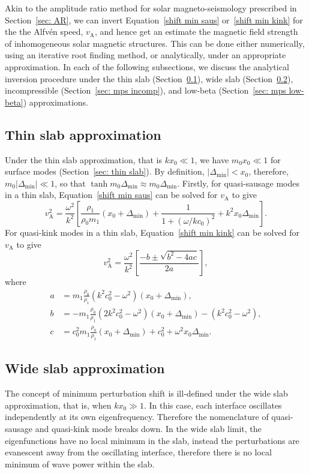 \documentclass[12pt]{../style-files/ociamthesis}
\begin{document}
Akin to the amplitude ratio method for solar magneto-seismology prescribed in Section~\ref{sec: AR}, we can invert Equation~\eqref{shift min saus} or~\eqref{shift min kink} for the the Alfv\'{e}n speed, $v_\textrm{A}$, and hence get an estimate the magnetic field strength of inhomogeneous solar magnetic structures. This can be done either numerically, using an iterative root finding method, or analytically, under an appropriate approximation. In each of the following subsections, we discuss the analytical inversion procedure under the thin slab (Section~\ref{sec: mps thin}), wide slab (Section~\ref{sec: mps wide}), incompressible (Section~\ref{sec: mps incomp}), and low-beta (Section~\ref{sec: mps low-beta}) approximations.


\subsection{Thin slab approximation} \label{sec: mps thin}
Under the thin slab approximation, that is $kx_0 \ll 1$, we have $m_0x_0 \ll 1$ for surface modes (Section~\ref{sec: thin slab}). By definition, $|\Delta_\textrm{min}| < x_0$, therefore, $m_0|\Delta_\textrm{min}| \ll 1$, so that $\tanh{m_0\Delta_\textrm{min}} \approx m_0\Delta_\textrm{min}$. Firstly, for quasi-sausage modes in a thin slab, Equation~\eqref{shift min saus} can be solved for $v_\textrm{A}$ to give
\begin{equation}
v_\textrm{A}^2 = \frac{\omega^2}{k^2} \left[\frac{\rho_1}{\rho_0m_1}(x_0 + \Delta_\textrm{min}) + \frac{1}{1 + (\omega / kc_0)^2} + k^2x_0\Delta_\textrm{min}\right].
\end{equation}
For quasi-kink modes in a thin slab, Equation~\eqref{shift min kink} can be solved for $v_\textrm{A}$ to give
\begin{equation}
v_\textrm{A}^2 = \frac{\omega^2}{k^2}\left[\frac{-b \pm \sqrt{b^2 - 4ac}}{2a}\right],
\end{equation}
where
\begin{align}
a &= m_1\frac{\rho_0}{\rho_1}(k^2c_0^2 - \omega^2)(x_0 + \Delta_\textrm{min}), \\
b &= -m_1\frac{\rho_0}{\rho_1}(2k^2c_0^2 - \omega^2)(x_0 + \Delta_\textrm{min}) - (k^2c_0^2 - \omega^2), \\
c &= c_0^2m_1\frac{\rho_0}{\rho_1}(x_0 + \Delta_\textrm{min}) + c_0^2 + \omega^2x_0\Delta_\textrm{min}.
\end{align}


\subsection{Wide slab approximation} \label{sec: mps wide}
The concept of minimum perturbation shift is ill-defined under the wide slab approximation, that is, when $kx_0 \gg 1$. In this case, each interface oscillates independently at its own eigenfrequency. Therefore the nomenclature of quasi-sausage and quasi-kink mode breaks down. In the wide slab limit, the eigenfunctions have no local minimum in the slab, instead the perturbations are evanescent away from the oscillating interface, therefore there is no local minimum of wave power within the slab.
\end{document}
